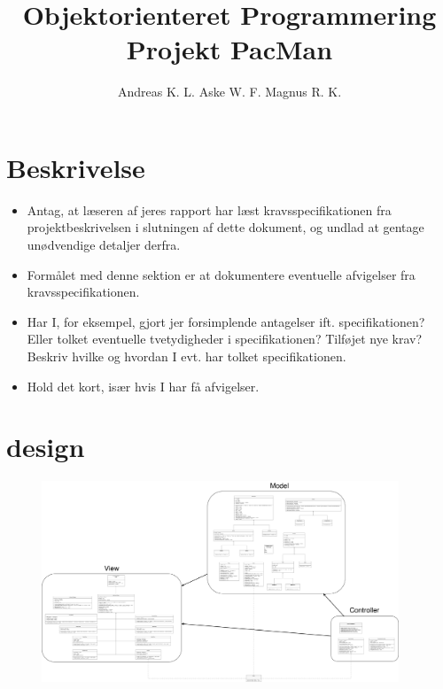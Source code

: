 \documentclass{article}
\title{\textbf{Objektorienteret Programmering Projekt PacMan}}
\author{Andreas K. L. \quad Aske W. F. \quad Magnus R. K.}
\theoremstyle{mytheoremstyle}
\theoremstyle{mytheoremstyle}
\theoremstyle{myproblemstyle}
\begin{document}
    \maketitle
    \newpage
    \tableofcontents
    \newpage

\section{Beskrivelse}\label{sec:Beskrivelse} %

\begin{itemize}
  \item Antag, at læseren af jeres rapport har læst kravsspecifikationen fra
  projektbeskrivelsen i slutningen af dette dokument, og undlad at gentage
  unødvendige detaljer derfra.
  \item Formålet med denne sektion er at dokumentere eventuelle afvigelser fra
  kravsspecifikationen.
  \item Har I, for eksempel, gjort jer forsimplende antagelser ift.
  specifikationen? Eller tolket eventuelle tvetydigheder i specifikationen?
  Tilføjet nye krav? Beskriv hvilke og hvordan I evt. har tolket
  specifikationen.
  \item Hold det kort, især hvis I har få afvigelser.
\end{itemize}

\section{design}\label{sec:design} %

\begin{figure}
    \begin{center}
        \includegraphics[width=0.95\textwidth]{figures/UML-diagram.png}
    \end{center}
    \caption{}
    \label{fig:}
\end{figure}
\end{document}
